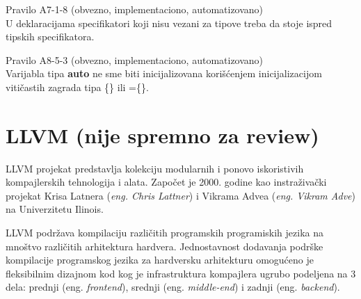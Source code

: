 \documentclass[12pt,oneside]{memoir}
\begin{document}
\begin{center}
\begin{tcolorbox}
Pravilo A7-1-8 (obvezno, implementaciono, automatizovano) \\
U deklaracijama specifikatori koji nisu vezani za tipove treba da stoje
ispred tipskih specifikatora.
\end{tcolorbox}
\end{center}

\begin{center}
\begin{tcolorbox}
Pravilo A8-5-3 (obvezno, implementaciono, automatizovano) \\
Varijabla tipa \textbf{auto} ne sme biti inicijalizovana kori\v{s}\'{c}enjem
inicijalizacijom viti\v{c}astih zagrada tipa \{\} ili =\{\}.
\end{tcolorbox}
\end{center}



\chapter{LLVM (nije spremno za review)}
\label{chp:llvm}

LLVM projekat predstavlja kolekciju modularnih i ponovo iskoristivih kompajlerskih tehnologija i alata.
Započet je 2000. godine kao instraživački projekat Krisa Latnera (\textit{eng. Chris Lattner}) i Vikrama Advea (\textit{eng. Vikram Adve}) na Univerzitetu Ilinois.

LLVM podržava kompilaciju različitih programskih programiskih jezika na mnoštvo različitih arhitektura hardvera. Jednostavnost dodavanja podrške kompilacije programskog jezika za hardversku arhitekturu omogućeno je fleksibilnim dizajnom kod kog je infrastruktura kompajlera ugrubo podeljena na 3 dela: prednji (eng. \textit{frontend}), srednji (eng. \textit{middle-end}) i zadnji (eng. \textit{backend}). 
\end{document}
